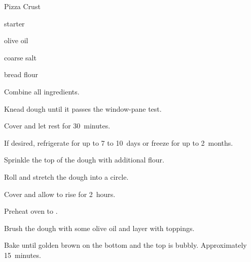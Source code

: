\begin{recipe}{Pizza Crust}{}{}

\begin{ingredients}
\item \C{1\half} starter
\item {} olive oil
\item {} coarse salt
\item \C{1\half} bread flour
\end{ingredients}

\begin{directions}
\item Combine all ingredients.
\item Knead dough until it passes the window-pane test.
\item Cover and let rest for 30~minutes.
\item If desired, refrigerate for up to 7 to 10~days or freeze for up to 2~months.
\item Sprinkle the top of the dough with additional flour.
\item Roll and stretch the dough into a circle.
\item Cover and allow to rise for 2~hours.
\item Preheat oven to .
\item Brush the dough with some olive oil and layer with toppings.
\item Bake until golden brown on the bottom and the top is bubbly. Approximately 15~minutes.
\end{directions}
\end{recipe}

